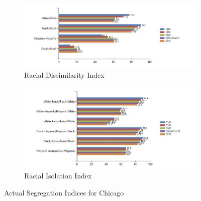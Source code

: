 {\begin{figure}[!h]
\centering
\begin{subfigure}[b]{.5\textwidth}
  \centering
\includegraphics[scale=.35]{figures/chart1.png}
\caption{Racial Dissimilarity Index}
\end{subfigure}%
\begin{subfigure}[b]{.5\textwidth}
  \centering
\includegraphics[scale=.35]{figures/chart2.png}
\caption{Racial Isolation Index}
\end{subfigure}
\caption{Actual Segregation Indices for Chicago}
\end{figure}

}
